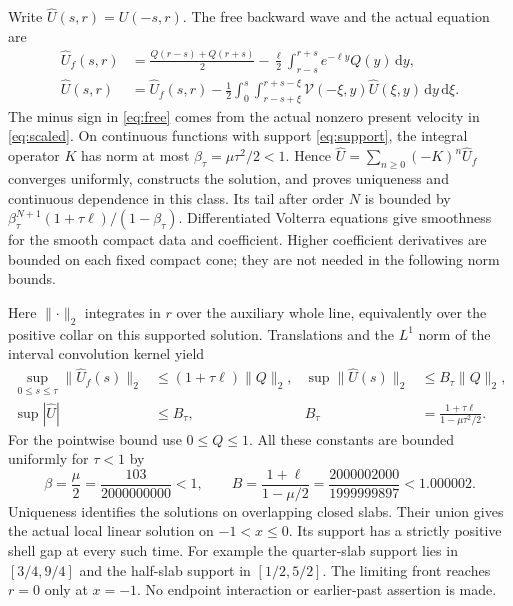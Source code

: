 \documentclass[11pt]{article}
\newcommand{\dd}{\,\mathrm d}
\newcommand{\norm}[1]{\lVert #1\rVert}
\begin{document}
Write $\widehat U(s,r)=U(-s,r)$. The free backward wave and the actual equation are
\begin{align}
 \widehat U_f(s,r)&=\frac{Q(r-s)+Q(r+s)}2
        -\frac\ell2\int_{r-s}^{r+s}e^{-\ell y}Q(y)\dd y,\label{eq:free}\\
 \widehat U(s,r)&=\widehat U_f(s,r)-\frac12\int_0^s
       \int_{r-s+\xi}^{r+s-\xi}\mathcal V(-\xi,y)\widehat U(\xi,y)\dd y\dd\xi .
 \label{eq:volterra}
\end{align}
The minus sign in \eqref{eq:free} comes from the actual nonzero present
velocity in \eqref{eq:scaled}. On continuous functions with support
\eqref{eq:support}, the integral operator $K$ has norm at most
$\beta_\tau=\mu\tau^2/2<1$. Hence
$\widehat U=\sum_{n\ge0}(-K)^n\widehat U_f$ converges uniformly, constructs the solution,
and proves uniqueness and continuous dependence in this class.
Its tail after order $N$ is bounded by
$\beta_\tau^{N+1}(1+\tau\ell)/(1-\beta_\tau)$.
Differentiated Volterra equations give smoothness for the smooth compact
data and coefficient. Higher coefficient derivatives are bounded on
each fixed compact cone; they are not needed in the following norm bounds.

Here $\norm{\cdot}_2$ integrates in $r$ over the auxiliary whole line,
equivalently over the positive collar on this supported solution.
Translations and the $L^1$ norm of the interval convolution kernel yield
\begin{equation}
\begin{aligned}
 \sup_{0\le s\le\tau}\norm{\widehat U_f(s)}_2
     &\le(1+\tau\ell)\norm{Q}_2,&
 \sup\norm{\widehat U(s)}_2&\le B_\tau\norm{Q}_2,\\
 \sup|\widehat U|&\le B_\tau,&
 B_\tau&=\frac{1+\tau\ell}{1-\mu\tau^2/2}.
\end{aligned}
\label{eq:norms}
\end{equation}
For the pointwise bound use $0\le Q\le1$.
All these constants are bounded uniformly for $\tau<1$ by
\begin{equation}
 \beta=\frac\mu2=\frac{103}{2000000000}<1,\qquad
 B=\frac{1+\ell}{1-\mu/2}
       =\frac{2000002000}{1999999897}<1.000002 .
 \label{eq:B}
\end{equation}
Uniqueness identifies the solutions on overlapping closed slabs.
Their union gives the actual local linear solution on $-1<x\le0$.
Its support has a strictly positive shell gap at every such time.
For example the quarter-slab support lies in $[3/4,9/4]$ and the
half-slab support in $[1/2,5/2]$. The limiting front reaches $r=0$
only at $x=-1$. No endpoint interaction or earlier-past assertion is made.
\end{document}
